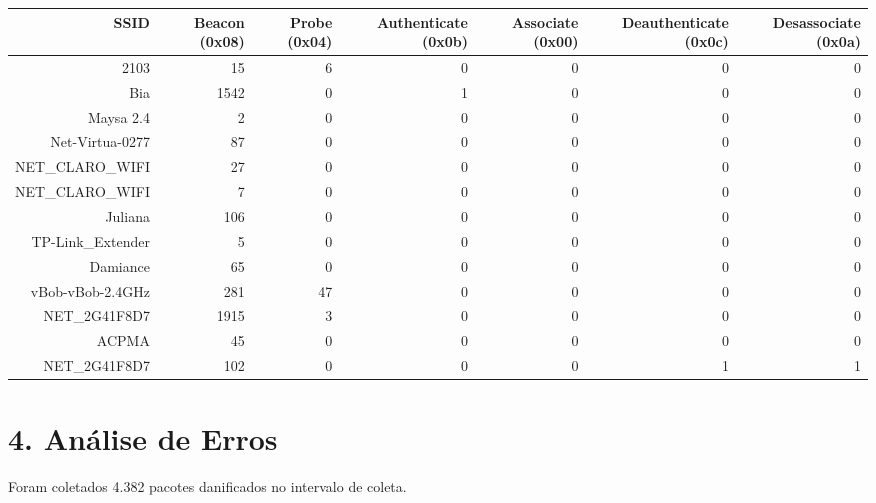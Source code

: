\documentclass{article}
\begin{document}
\begin{table}[ht]
\centering
\begin{adjustbox}{width=1\textwidth}
\small
\begin{tabular}{rrrrrrr}
  SSID               & Beacon (0x08)  & Probe (0x04)  &  Authenticate (0x0b)  &  Associate (0x00) &  Deauthenticate (0x0c) &  Desassociate (0x0a) \\
  \hline
  2103               & 15             & 6             &  0                    &  0                &  0                     &  0                   \\
  Bia                & 1542           & 0             &  1                    &  0                &  0                     &  0                   \\
  Maysa 2.4          & 2              & 0             &  0                    &  0                &  0                     &  0                   \\
  Net-Virtua-0277    & 87             & 0             &  0                    &  0                &  0                     &  0                   \\
  NET\_CLARO\_WIFI   & 27             & 0             &  0                    &  0                &  0                     &  0                   \\
  NET\_CLARO\_WIFI   & 7              & 0             &  0                    &  0                &  0                     &  0                   \\
  Juliana            & 106            & 0             &  0                    &  0                &  0                     &  0                   \\
  TP-Link\_Extender   & 5              & 0             &  0                    &  0                &  0                     &  0                   \\
  Damiance           & 65             & 0             &  0                    &  0                &  0                     &  0                   \\           
  vBob-vBob-2.4GHz   & 281            & 47            &  0                    &  0                &  0                     &  0                   \\
  NET\_2G41F8D7      & 1915           & 3             &  0                    &  0                &  0                     &  0                   \\
  ACPMA              & 45             & 0             &  0                    &  0                &  0                     &  0                   \\
  NET\_2G41F8D7      & 102            & 0             &  0                    &  0                &  1                     &  1                   \\
\hline
\end{tabular}
\end{adjustbox}
\end{table} 

\section*{4. Análise de Erros}

\par Foram coletados 4.382 pacotes danificados no intervalo de coleta.


\end{document}
